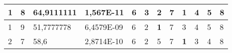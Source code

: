 \documentclass[conference]{IEEEtran}
\begin{document}
\begin{table*}[]
\begin{tabular}{|llll|llllllll|}
\multicolumn{1}{|l|}{1}                                                     & \multicolumn{1}{l|}{8}                                                        & \multicolumn{1}{l|}{64,9111111}                                                   & 1,567E-11                      & \multicolumn{1}{l|}{6}                                                  & \multicolumn{1}{l|}{3}                                                  & \multicolumn{1}{l|}{2}                                                  & \multicolumn{1}{l|}{7}                                                  & \multicolumn{1}{l|}{\textbf{1}}                                         & \multicolumn{1}{l|}{4}                                                  & \multicolumn{1}{l|}{5}                                                  & 8                          \\ \hline
\multicolumn{1}{|l|}{1}                                                     & \multicolumn{1}{l|}{9}                                                        & \multicolumn{1}{l|}{51,7777778}                                                   & 6,4579E-09                     & \multicolumn{1}{l|}{6}                                                  & \multicolumn{1}{l|}{2}                                                  & \multicolumn{1}{l|}{\textbf{1}}                                         & \multicolumn{1}{l|}{7}                                                  & \multicolumn{1}{l|}{3}                                                  & \multicolumn{1}{l|}{4}                                                  & \multicolumn{1}{l|}{5}                                                  & 8                          \\ \hline
\multicolumn{1}{|l|}{2}                                                     & \multicolumn{1}{l|}{7}                                                        & \multicolumn{1}{l|}{58,6}                                                         & 2,8714E-10                     & \multicolumn{1}{l|}{6}                                                  & \multicolumn{1}{l|}{2}                                                  & \multicolumn{1}{l|}{5}                                                  & \multicolumn{1}{l|}{7}                                                  & \multicolumn{1}{l|}{\textbf{1}}                                         & \multicolumn{1}{l|}{3}                                                  & \multicolumn{1}{l|}{4}                                                  & 8                          \\ \hline

\end{tabular}
\end{table*}
\end{document}
